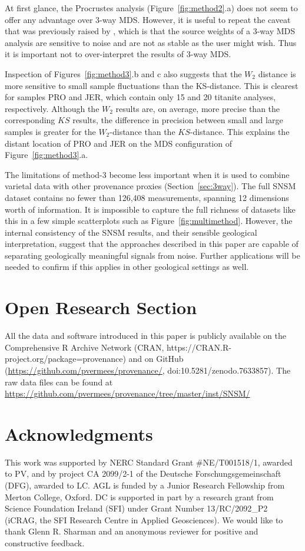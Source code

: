 \documentclass{article}
\begin{document}
At first glance, the Procrustes analysis (Figure~\ref{fig:method2}.a)
does not seem to offer any advantage over 3-way MDS. However, it is
useful to repeat the caveat that was previously raised by
, which is that the source weights of a 3-way MDS
analysis are sensitive to noise and are not as stable as the user
might wish. Thus it is important not to over-interpret the results of
3-way MDS.\medskip

Inspection of Figures~\ref{fig:method3}.b and c also suggests that the
$W_2$ distance is more sensitive to small sample fluctuations than the
KS-distance. This is clearest for samples PRO and JER, which contain
only 15 and 20 titanite analyses, respectively. Although the $W_2$
results are, on average, more precise than the corresponding $KS$
results, the difference in precision between small and large samples
is greater for the $W_2$-distance than the $KS$-distance. This
explains the distant location of PRO and JER on the MDS configuration
of Figure~\ref{fig:method3}.a.\medskip

The limitations of method-3 become less important when it is used to
combine varietal data with other provenance proxies
(Section~\ref{sec:3way}). The full SNSM dataset contains no fewer than
126,408 measurements, spanning 12 dimensions worth of information.  It
is impossible to capture the full richness of datasets like this in a
few simple scatterplots such as Figure~\ref{fig:multimethod}. However,
the internal consistency of the SNSM results, and their sensible
geological interpretation, suggest that the approaches described in
this paper are capable of separating geologically meaningful signals
from noise. Further applications will be needed to confirm if this
applies in other geological settings as well.

\section*{Open Research Section}
All the data and software introduced in this paper is publicly
available on the Comprehensive R Archive Network (CRAN,
https://CRAN.R-project.org/package=provenance) and on GitHub
(\url{https://github.com/pvermees/provenance/},
doi:10.5281/zenodo.7633857). The raw data files can be found at
\url{https://github.com/pvermees/provenance/tree/master/inst/SNSM/}

\section*{Acknowledgments} This work was supported by NERC Standard Grant
\#NE/T001518/1, awarded to PV, and by project CA 2099/2-1 of the
Deutsche Forschungsgemeinschaft (DFG), awarded to LC. AGL is funded by
a Junior Research Fellowship from Merton College, Oxford. DC is
supported in part by a research grant from Science Foundation Ireland
(SFI) under Grant Number 13/RC/2092\_P2 (iCRAG, the SFI Research
Centre in Applied Geosciences). We would like to thank Glenn
R. Sharman and an anonymous reviewer for positive and constructive
feedback.
\end{document}
